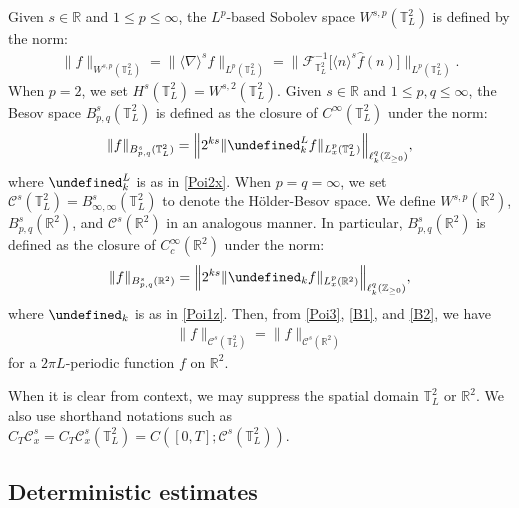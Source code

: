 \documentclass[letterpaper, 11pt,  reqno]{amsart}
\theoremstyle{myremark}
\newcommand{\1}{\hspace{0.5mm}\text{I}\hspace{0.5mm}}
\newcommand{\Z}{\mathbb{Z}}
\newcommand{\R}{\mathbb{R}}
\newcommand{\T}{\mathbb{T}}
\newcommand{\CC}{\mathcal{C}}
\let\P= \undefined
\newcommand{\P}{\mathbf{P}}
\newcommand{\F}{\mathcal{F}}
\newcommand{\nb}{\nabla}
\newcommand{\ft}{\widehat}
\renewcommand{\l}{\ell}
\newcommand{\jb}[1]
{\langle #1 \rangle}
\numberwithin{equation}{section}
\numberwithin{theorem}{section}
\begin{document}
Given  $s \in \R $ and $1 \le p  \le \infty$,
the $L^p$-based Sobolev space $W^{s,p}(\T_L^2)$ is defined 
by  the norm:
\begin{align*}
\|f\|_{W^{s,p}(\T_L^2)} = \| \jb \nb ^s f   \|_{L^p(\T_L^2)} = \big\| \F_{\T^2_L}^{-1} \big[ \jb n ^s \ft f (n) \big]\! \big\|_{L^p(\T_L^2)}.
\end{align*}
When $p = 2$, we set $H^s(\T_L^2) = W^{s, 2}(\T_L^2)$.
 Given  $s \in \R $ and $1 \le p, q  \le \infty$,
the Besov space $B^{s}_{p,q}(\T_L^2)$ is defined as the closure of 
$C^\infty(\T_L^2)$  under the norm:
\begin{align}
\|f\|_{B^{s}_{p,q}(\T_L^2)} =  \Big\| 2^{ks} \|\P_k^L f \|_{L^p_x(\T_L^2)} \Big\|_{\l^q_k(\Z_{\ge 0})}, 
\label{B1}
\end{align}
where 
$\P_k^L$ is as in  \eqref{Poi2x}.
When $p = q = \infty$, we set  $\CC^s(\T_L^2) = B^s_{\infty, \infty}(\T_L^2)$
to denote the H\"older-Besov space. 
We define   $W^{s,p}(\R^2)$, $B^{s}_{p,q}(\R^2)$,  and $\CC^s(\R^2)$
in an analogous manner.
In particular, $B^s_{p, q}(\R^2)$ is defined as the closure of $C^\infty_c(\R^2)$
under the norm:
\begin{align}
\|f\|_{B^s_{p, q}(\R^2)} =  \Big\| 2^{ks} \|\P_k f \|_{L^p_x(\R^2)} \Big\|_{\l^q_k(\Z_{\ge 0})}, 
\label{B2}
\end{align}
where $\P_k$ is as in \eqref{Poi1z}.
Then, 
from \eqref{Poi3}, \eqref{B1}, and \eqref{B2}, 
we have
\begin{align}
\|f\|_{\CC^s(\T^2_L)} 
= \|f\|_{\CC^s(\R^2)}\label{B3}
\end{align}
for  a $2\pi L$-periodic function $f$ on $\R^2$.



%


When it is clear from context, we may suppress the spatial domain
$\T^2_L$ or $\R^2$.
We also use shorthand notations such as
 $C_T\CC^s_x= C_T\CC^s_x(\T^2_L) = C([0, T]; \CC^s(\T_L^2))$.



  
\subsection{Deterministic estimates}
\end{document}

